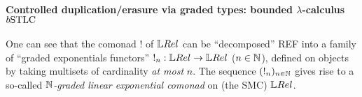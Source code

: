 





\paragraph*{Controlled duplication/erasure via graded types: bounded $\lambda$-calculus $\BSTLC$}\label{sec:BSTLC}

One can see that the comonad $!$ of $\LREL$ can be ``decomposed'' {\color{red}REF} into a family of ``graded exponentials functors'' $!_n:\LREL\to\LREL$ ($n\in\mathbb{N}$), defined on objects by taking multisets of cardinality \emph{at most} $n$. %
The sequence $(!_n)_{n\in\mathbb{N}}$ gives rise to a so-called \emph{$\mathbb{N}$-graded linear exponential comonad} on (the SMC) $\LREL$. %

